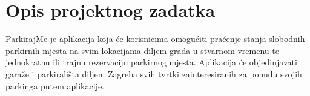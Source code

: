\chapter{Opis projektnog zadatka}

ParkirajMe je aplikacija koja će korisnicima omogućiti praćenje stanja slobodnih
parkirnih mjesta na svim lokacijama diljem grada u stvarnom vremenu te jednokratnu ili trajnu rezervaciju parkirnog mjesta. Aplikacija će objedinjavati garaže i parkirališta diljem Zagreba svih tvrtki zainteresiranih za ponudu svojih parkinga putem aplikacije. 


